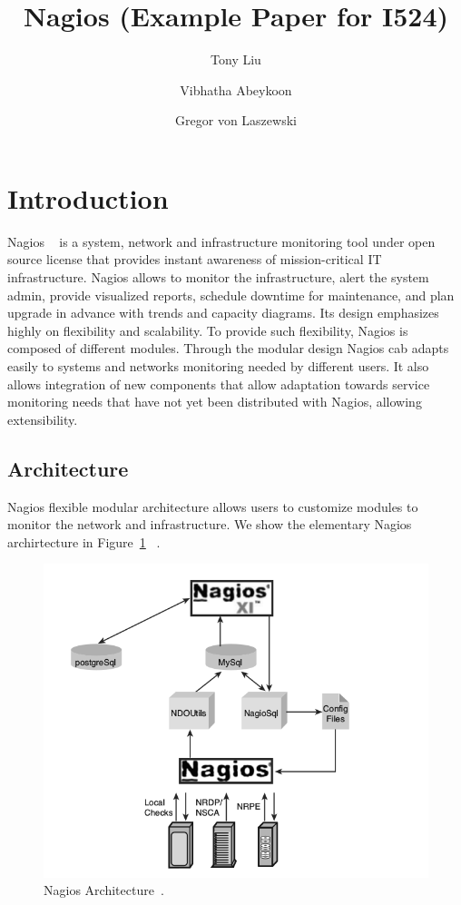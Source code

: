 \documentclass[9pt,twocolumn,twoside]{styles/osajnl}
\title{\centering%
Nagios (Example Paper for I524)}
\author[1]{Tony Liu}
\author[1]{Vibhatha Abeykoon}
\author[1]{Gregor von Laszewski}
\affil[1]{School of Informatics and Computing, Bloomington, IN 47408, U.S.A.}
\begin{document}
\maketitle

\section{Introduction}

Nagios ~\cite{www-nagios, wiki-nagios} is a system, network and
infrastructure monitoring tool under open source license that provides
instant awareness of mission-critical IT infrastructure. Nagios allows
to monitor the infrastructure, alert the system admin, provide
visualized reports, schedule downtime for maintenance, and plan
upgrade in advance with trends and capacity diagrams. Its design
emphasizes highly on flexibility and scalability. To provide such
flexibility, Nagios is composed of different modules. Through the
modular design Nagios cab adapts easily to systems and networks
monitoring needed by different users. It also allows integration of new
components that allow adaptation towards service monitoring needs that
have not yet been distributed with Nagios, allowing extensibility.

\subsection{Architecture}

Nagios \cite{nagios-paper-2012} flexible modular architecture allows
users to customize modules to monitor the network and
infrastructure. We show the elementary Nagios archirtecture in
Figure~\ref{fig:Nagios-architecture} ~\cite{nagios-book}.

\begin{figure}[htb]
\centering
\includegraphics[width=\columnwidth]{images/nagios-architecture}
\caption{Nagios Architecture~\cite{nagios-book}.}
\label{fig:Nagios-architecture}
\end{figure}
\end{document}
